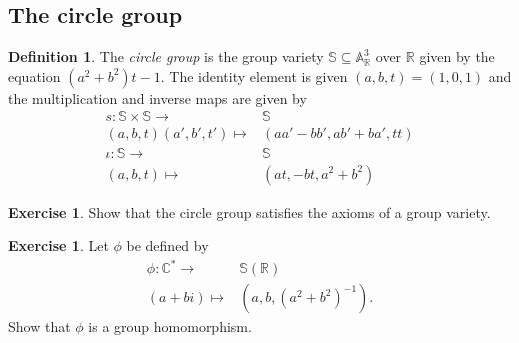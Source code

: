 \documentclass[a4paper,12pt,reqno]{amsart}
\makeatletter
\renewcommand{\listoftodos}[1][\@todonotes@todolistname]{%
	\@starttoc{tdo}{#1}}
\newcommand{\field}[1]{\mathbb{#1}}  %
\newcommand{\R}{\field{R}} %
\newcommand{\C}{\field{C}} %
\newcommand{\A}{\field{A}}
\renewcommand{\SS}{\field{S}}
\theoremstyle{definition}
\newtheorem{definition}[lemma]{Definition}
\newtheorem{exercise}[lemma]{Exercise}
\numberwithin{lemma}{section}
\numberwithin{equation}{section}
\numberwithin{figure}{section}
\makeatother
\begin{document}
\subsection{The circle group}

\begin{definition}
	The \textit{circle group} is the group variety $\SS \subseteq \A^3_\R$ over $\R$ given by the equation $(a^2+b^2)t-1$. The identity element is given $(a,b,t)=(1,0,1)$ and the multiplication and inverse maps are given by
	\begin{align*}
	 s : \SS \times \SS \to& \SS \\
	   (a,b,t)(a',b',t') \mapsto& (aa'-bb',ab'+ba', tt) \\
	 \iota : \SS \to & \SS\\
	           (a,b,t) \mapsto& (at,-bt,a^2+b^2)
	\end{align*} 
\end{definition}

\begin{exercise}
	Show that the circle group satisfies the axioms of a group variety.
\end{exercise}
\begin{exercise}
Let $\phi$ be defined by 
\begin{align*}
  \phi:\C^* \to& \SS(\R) \\
         (a+bi) \mapsto& (a,b,(a^2+b^2)^{-1}).
\end{align*}
Show that $\phi$ is a group homomorphism.
\end{exercise}




\listoftodos


{}
\end{document}
